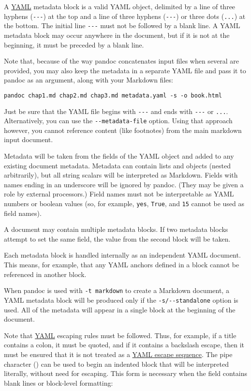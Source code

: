 A \href{https://yaml.org/spec/1.2/spec.html}{YAML} metadata block is a
valid YAML object, delimited by a line of three hyphens
(\texttt{-\/-\/-}) at the top and a line of three hyphens
(\texttt{-\/-\/-}) or three dots (\texttt{...}) at the bottom. The
initial line \texttt{-\/-\/-} must not be followed by a blank line. A
YAML metadata block may occur anywhere in the document, but if it is not
at the beginning, it must be preceded by a blank line.

Note that, because of the way pandoc concatenates input files when
several are provided, you may also keep the metadata in a separate YAML
file and pass it to pandoc as an argument, along with your Markdown
files:

\begin{verbatim}
pandoc chap1.md chap2.md chap3.md metadata.yaml -s -o book.html
\end{verbatim}

Just be sure that the YAML file begins with \texttt{-\/-\/-} and ends
with \texttt{-\/-\/-} or \texttt{...}. Alternatively, you can use the
\texttt{-\/-metadata-file} option. Using that approach however, you
cannot reference content (like footnotes) from the main markdown input
document.

Metadata will be taken from the fields of the YAML object and added to
any existing document metadata. Metadata can contain lists and objects
(nested arbitrarily), but all string scalars will be interpreted as
Markdown. Fields with names ending in an underscore will be ignored by
pandoc. (They may be given a role by external processors.) Field names
must not be interpretable as YAML numbers or boolean values (so, for
example, \texttt{yes}, \texttt{True}, and \texttt{15} cannot be used as
field names).

A document may contain multiple metadata blocks. If two metadata blocks
attempt to set the same field, the value from the second block will be
taken.

Each metadata block is handled internally as an independent YAML
document. This means, for example, that any YAML anchors defined in a
block cannot be referenced in another block.

When pandoc is used with \texttt{-t\ markdown} to create a Markdown
document, a YAML metadata block will be produced only if the
\texttt{-s/-\/-standalone} option is used. All of the metadata will
appear in a single block at the beginning of the document.

Note that \href{https://yaml.org/spec/1.2/spec.html}{YAML} escaping
rules must be followed. Thus, for example, if a title contains a colon,
it must be quoted, and if it contains a backslash escape, then it must
be ensured that it is not treated as a
\href{https://yaml.org/spec/1.2/spec.html\#id2776092}{YAML escape
sequence}. The pipe character (\texttt{\textbar{}}) can be used to begin
an indented block that will be interpreted literally, without need for
escaping. This form is necessary when the field contains blank lines or
block-level formatting:

